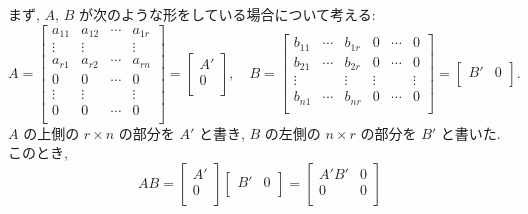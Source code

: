 \documentclass[12pt,twoside]{jarticle}
\begin{document}
\begin{rem}[長方形型の行列の積の行列式]
  \label{rem:chohokei-det}
  まず, $A$, $B$ が次のような形をしている場合について考える:
  \begin{equation*}
    A = 
    \begin{bmatrix}
      a_{11} & a_{12} & \cdots & a_{1r} \\
      \vdots & \vdots &        & \vdots \\
      a_{r1} & a_{r2} & \cdots & a_{rn} \\
      0      & 0      & \cdots & 0 \\
      \vdots & \vdots &        & \vdots \\
      0      & 0      & \cdots & 0 \\
    \end{bmatrix}
    =
    \begin{bmatrix}
      A'\\
      0 \\
    \end{bmatrix},
    \quad
    B = 
    \begin{bmatrix}
      b_{11} & \cdots & b_{1r} & 0 & \cdots & 0 \\
      b_{21} & \cdots & b_{2r} & 0 & \cdots & 0 \\
      \vdots &        & \vdots & \vdots & & \vdots \\
      b_{n1} & \cdots & b_{nr} & 0 & \cdots & 0 \\
    \end{bmatrix}
    =
    \begin{bmatrix}
      B' & 0 \\
    \end{bmatrix}.
  \end{equation*}
  $A$ の上側の $r\times n$ の部分を $A'$ と書き,
  $B$ の左側の $n\times r$ の部分を $B'$ と書いた.
  このとき,
  \begin{equation*}
    AB = 
    \begin{bmatrix}
      A'\\
      0 \\
    \end{bmatrix}
    \begin{bmatrix}
      B' & 0 \\
    \end{bmatrix}
    =
    \begin{bmatrix}
      A'B' & 0 \\
      0    & 0 \\
    \end{bmatrix}

\end{equation*}
\end{rem}
\end{document}
